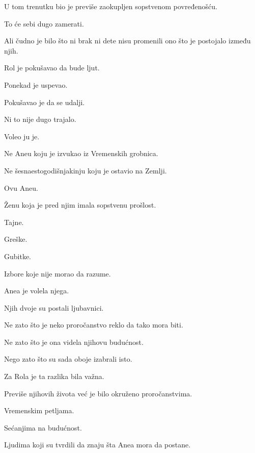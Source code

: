 U tom trenutku bio je previše zaokupljen sopstvenom povređenošću.

\bigskip

To će sebi dugo zamerati.

\bigskip

Ali čudno je bilo što ni brak ni dete nisu promenili ono što je postojalo između njih.

\bigskip

Rol je pokušavao da bude ljut.

Ponekad je uspevao.

\bigskip

Pokušavao je da se udalji.

Ni to nije dugo trajalo.

\bigskip

Voleo ju je.

\bigskip

Ne Aneu koju je izvukao iz Vremenskih grobnica.

Ne šesnaestogodišnjakinju koju je ostavio na Zemlji.

\bigskip

Ovu Aneu.

\bigskip

Ženu koja je pred njim imala sopstvenu prošlost.

Tajne.

Greške.

Gubitke.

Izbore koje nije morao da razume.

\bigskip

Anea je volela njega.

\bigskip

Njih dvoje su postali ljubavnici.

\bigskip

Ne zato što je neko proročanstvo reklo da tako mora biti.

Ne zato što je ona videla njihovu budućnost.

\bigskip

Nego zato što su sada oboje izabrali isto.

\bigskip

Za Rola je ta razlika bila važna.

\bigskip

Previše njihovih života već je bilo okruženo proročanstvima.

Vremenskim petljama.

Sećanjima na budućnost.

Ljudima koji su tvrdili da znaju šta Anea mora da postane.

